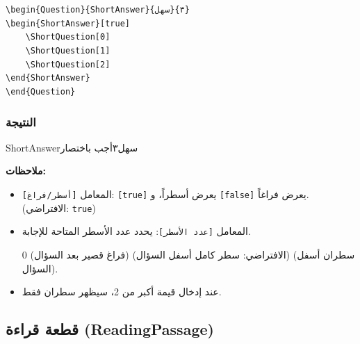 \documentclass[a4paper]{article}
\begin{document}
\begin{LTR}\ttfamily
\verb|\begin{Question}{ShortAnswer}{سهل}{٣}|\\
\verb|\begin{ShortAnswer}[true]|\\
\verb|    \ShortQuestion[0]|\\    
\verb|    \ShortQuestion[1]|\\
\verb|    \ShortQuestion[2]|\\
\verb|\end{ShortAnswer}|\\
\verb|\end{Question}|
\end{LTR}

\subsubsection*{النتيجة}

\begin{Question}{ShortAnswer}{سهل}{٣}{أجب باختصار}
\begin{ShortAnswer}[true]
\end{ShortAnswer}
\end{Question}

\textbf{ملاحظات:}
\begin{itemize}
    \item المعامل \texttt{[أسطر/فراغ]}: \texttt{[true]} يعرض أسطراً، و \texttt{[false]} يعرض فراغاً. (الافتراضي: \texttt{true})
    \item المعامل \texttt{[عدد الأسطر]}: يحدد عدد الأسطر المتاحة للإجابة.\par        
        
0 (فراغ قصير بعد السؤال) (الافتراضي: سطر كامل أسفل السؤال) (سطران أسفل السؤال).
    \item عند إدخال قيمة أكبر من 2، سيظهر سطران فقط.
\end{itemize}

\subsection{قطعة قراءة (ReadingPassage)}
\end{document}
